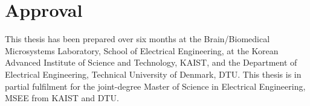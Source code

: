 \thispagestyle{main}

\chapter*{Approval}
This thesis has been prepared over six months at the Brain/Biomedical Microsystems Laboratory, School of Electrical Engineering, at the Korean Advanced Institute of Science and Technology, KAIST, and the Department of Electrical Engineering, Technical University of Denmark, DTU. This thesis is in partial fulfilment for the joint-degree Master of Science in Electrical Engineering, MSEE from KAIST and DTU.

\vfill

\begin{center}
\namesigdate{\thesisauthor~-~\studentnumber}
\end{center}
\thispagestyle{empty}
\vfill

